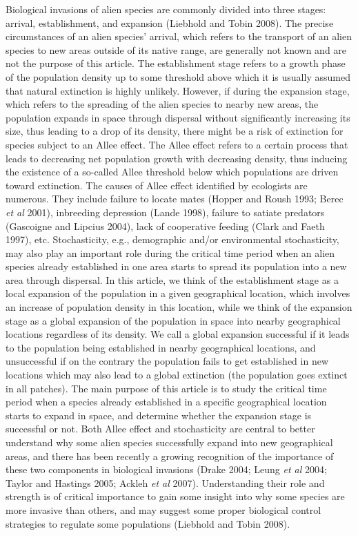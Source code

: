 \indent Biological invasions of alien species are commonly divided into three stages: arrival, establishment, and expansion
 (Liebhold and Tobin 2008).
 The precise circumstances of an alien species' arrival, which refers to the transport of an alien species to new areas outside of its
 native range, are generally not known and are not the purpose of this article.
 The establishment stage refers to a growth phase of the population density up to some threshold above which it is usually assumed that natural
 extinction is highly unlikely.
 However, if during the expansion stage, which refers to the spreading of the alien species to nearby new areas, the population expands
 in space through dispersal without significantly increasing its size, thus leading to a drop of its density, there might be a risk of
 extinction for species subject to an Allee effect.
 The Allee effect refers to a certain process that leads to decreasing net population growth with decreasing density, thus inducing the
 existence of a so-called Allee threshold below which populations are driven toward extinction.
 The causes of Allee effect identified by ecologists are numerous.
 They include failure to locate mates (Hopper and Roush 1993; Berec \emph{et al} 2001), inbreeding depression (Lande 1998), failure to satiate
 predators (Gascoigne and Lipcius 2004), lack of cooperative feeding (Clark and Faeth 1997), etc.
 Stochasticity, e.g., demographic and/or environmental stochasticity, may also play an important role during the critical time period when
 an alien species already established in one area starts to spread its population into a new area through dispersal.
 In this article,
 we think of the establishment stage as a local expansion of the population in a given geographical location, which involves an increase of
  population density in this location, while we think of the expansion stage as a global expansion of the population
 in space into nearby geographical locations regardless of its density.
 We call a global expansion successful if it leads to the population being established in nearby geographical locations, and unsuccessful if
 on the contrary the population fails to get established in new locations which may also lead to a global extinction (the population goes
 extinct in all patches).
 The main purpose of this article is to study the critical time period when a species already established in a specific geographical
 location starts to expand in space, and determine whether the expansion stage is successful or not.
 Both Allee effect and stochasticity are central to better understand why some alien species successfully expand into new geographical
 areas, and there has been recently a growing recognition of the importance of these two components in biological invasions (Drake 2004;
 Leung \emph{et al} 2004; Taylor and Hastings 2005; Ackleh \emph{et al} 2007).
 Understanding their role and strength is of critical importance to gain some insight into why some species are more invasive than others,
 and may suggest some proper biological control strategies to regulate some populations (Liebhold and Tobin 2008).

